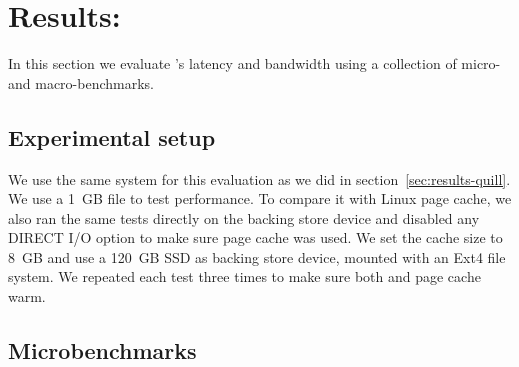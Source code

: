 

\section{Results: \CChell{}}
\label{sec:results-chell}

In this section we evaluate \CChell{}'s latency and bandwidth using a
collection of micro- and macro-benchmarks.  


\subsection{Experimental setup}
\label{sec:setup}

We use the same system for this evaluation as we did in
section~\ref{sec:results-quill}. We use a 1~GB file to test
\CChell{} performance. To compare it with Linux page cache, we also ran the
same tests directly on the backing store device and disabled any DIRECT I/O
option to make sure page cache was used.  We set the cache size to 8~GB and use
a 120~GB SSD as backing store device, mounted with an Ext4 file system.  We
repeated each test three times to make sure both \CChell{} and page cache warm.

\subsection{Microbenchmarks}
\label{sec:microbenchmark}



